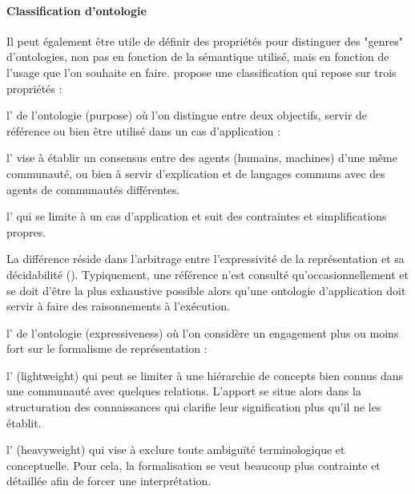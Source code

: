 \paragraph{Classification d'ontologie}
Il peut également être utile de définir des propriétés pour distinguer des "genres" d'ontologies, non pas en fonction de la sémantique utilisé, mais en fonction de l'usage que l'on souhaite en faire. 
\cite{Oberle2006} propose une classification qui repose sur trois propriétés : 
\begin{liste}
	\item l' de l'ontologie (purpose) où l'on distingue entre deux objectifs, servir de référence ou bien être utilisé dans un cas d'application :
	\begin{liste}
		\item l' vise à établir un consensus entre des agents (humains, machines) d'une même communauté, ou bien à servir d'explication et de langages communs avec des agents de communautés différentes. 
		\item l' qui se limite à un cas d'application et suit des contraintes et simplifications propres.
	\end{liste}
	La différence réside dans l'arbitrage entre l'expressivité de la représentation et sa décidabilité (\cite{Borgo2002}). 
	Typiquement, une référence n'est consulté qu'occasionnellement et se doit d'être la plus exhaustive possible alors qu'une ontologie d'application doit servir à faire des raisonnements à l'exécution. 

	\item l' de l'ontologie (expressiveness) où l'on considère un engagement plus ou moins fort sur le formalisme de représentation :
	\begin{liste}
		\item l' (lightweight) qui peut se limiter à une hiérarchie de concepts bien connus dans une communauté avec quelques relations. 
		L'apport se situe alors dans la structuration des connaissances qui clarifie leur signification plus qu'il ne les établit.
		\item l' (heavyweight) qui vise à exclure toute ambiguïté terminologique et conceptuelle.
		Pour cela, la formalisation se veut beaucoup plus contrainte et détaillée afin de forcer une interprétation. 
	\end{liste}


\end{liste}
